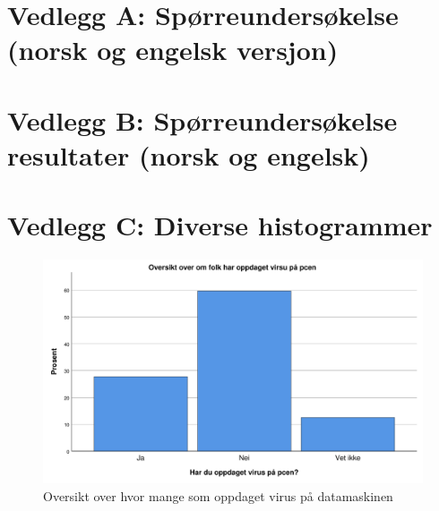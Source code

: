 \chapter*{Vedlegg A: Spørreundersøkelse (norsk og engelsk versjon)}

\label{undersokelse_norsk}


\label{undersokelse_engelsk}

\chapter*{Vedlegg B: Spørreundersøkelse resultater (norsk og engelsk)}

\label{undersokelse_norsk_resultater}


\label{undersokelse_engelsk_resultater}

\chapter*{Vedlegg C: Diverse histogrammer}
\begin{figure}[H]
    \centering
    \includegraphics[scale=0.5]{case_2/bilder/spss/oppdaget_virus.pdf}
    \caption[oppdaget-virus]{Oversikt over hvor mange som oppdaget virus på datamaskinen}
    \label{fig:oppdaget-virus}
\end{figure}

